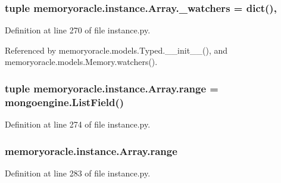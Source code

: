 \subsubsection[{\+\_\+watchers}]{\setlength{\rightskip}{0pt plus 5cm}tuple memoryoracle.\+instance.\+Array.\+\_\+watchers = dict()\hspace{0.3cm}{\ttfamily [static]}, {\ttfamily [private]}}\label{classmemoryoracle_1_1instance_1_1Array_a339afab4d326c225b0a95ee0cabcc19a}


Definition at line 270 of file instance.\+py.



Referenced by memoryoracle.\+models.\+Typed.\+\_\+\+\_\+init\+\_\+\+\_\+(), and memoryoracle.\+models.\+Memory.\+watchers().

\hypertarget{classmemoryoracle_1_1instance_1_1Array_acb456ee173f41d41e16e1bebfba48aa6}{}
\subsubsection[{range}]{\setlength{\rightskip}{0pt plus 5cm}tuple memoryoracle.\+instance.\+Array.\+range = mongoengine.\+List\+Field()\hspace{0.3cm}{\ttfamily [static]}}\label{classmemoryoracle_1_1instance_1_1Array_acb456ee173f41d41e16e1bebfba48aa6}


Definition at line 274 of file instance.\+py.

\hypertarget{classmemoryoracle_1_1instance_1_1Array_a8bf8e1844305ec3dc5d73ec1ed8c5ba3}{}
\subsubsection[{range}]{\setlength{\rightskip}{0pt plus 5cm}memoryoracle.\+instance.\+Array.\+range}\label{classmemoryoracle_1_1instance_1_1Array_a8bf8e1844305ec3dc5d73ec1ed8c5ba3}


Definition at line 283 of file instance.\+py.

\hypertarget{classmemoryoracle_1_1instance_1_1Array_ae8a854bbb76db4aa9661677964d99846}{}
